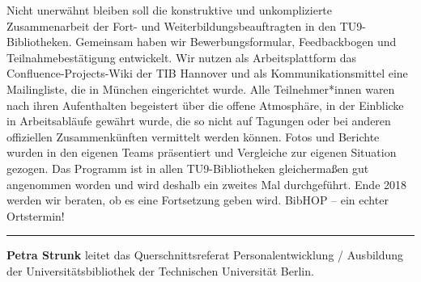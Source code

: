 \documentclass[a4paper,
fontsize=11pt,
oneside,
numbers=noperiodatend,
parskip=half-,
bibliography=totoc,
final
]{scrartcl}
\begin{document}
Nicht unerwähnt bleiben soll die konstruktive und unkomplizierte
Zusammenarbeit der Fort- und Weiterbildungsbeauftragten in den
TU9-Bibliotheken. Gemeinsam haben wir Bewerbungsformular, Feedbackbogen
und Teilnahmebestätigung entwickelt. Wir nutzen als Arbeitsplattform das
Confluence-Projects-Wiki der TIB Hannover und als Kommunikationsmittel
eine Mailingliste, die in München eingerichtet wurde. Alle
Teilnehmer*innen waren nach ihren Aufenthalten begeistert über die
offene Atmosphäre, in der Einblicke in Arbeitsabläufe gewährt wurde, die
so nicht auf Tagungen oder bei anderen offiziellen Zusammenkünften
vermittelt werden können. Fotos und Berichte wurden in den eigenen Teams
präsentiert und Vergleiche zur eigenen Situation gezogen. Das Programm
ist in allen TU9-Bibliotheken gleichermaßen gut angenommen worden und
wird deshalb ein zweites Mal durchgeführt. Ende 2018 werden wir beraten,
ob es eine Fortsetzung geben wird. BibHOP -- ein echter Ortstermin!

\begin{center}\rule{0.5\linewidth}{\linethickness}\end{center}

\textbf{Petra Strunk} leitet das Querschnittsreferat Personalentwicklung
/ Ausbildung der Universitätsbibliothek der Technischen Universität
Berlin.
\end{document}
